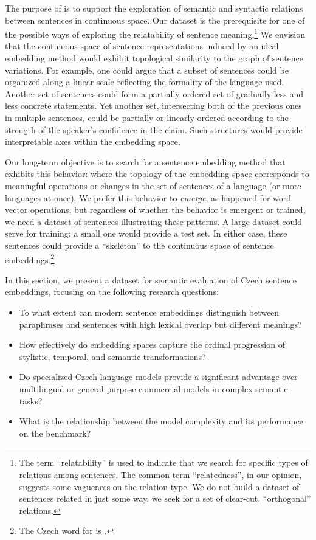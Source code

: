 The purpose of \costra is to support the exploration of semantic and syntactic relations between sentences in continuous space. Our dataset is the prerequisite for one of the possible ways of exploring the relatability of sentence meaning.\footnote{The term ``relatability'' is used to indicate that we search for specific types of relations among sentences. The common term ``relatedness'', in our opinion, suggests some vagueness on the relation type. We do not build a dataset of sentences related in just some way, we seek for a set of clear-cut, ``orthogonal'' relations.} We envision that the continuous space of sentence representations induced by an ideal embedding method would exhibit topological similarity to the graph of sentence variations. For example, one could argue that a subset of sentences could be organized along a linear scale reflecting the formality of the language used. Another set of sentences could form a partially ordered set of gradually less and less concrete statements. Yet another set, intersecting both of the previous ones in multiple sentences, could be partially or linearly ordered according to the strength of the speaker's confidence in the claim. Such structures would provide interpretable axes within the embedding space.

Our long-term objective is to search for a sentence embedding method that exhibits this behavior: where the topology of the embedding space corresponds to meaningful operations or changes in the set of sentences of a language (or more languages at once). We prefer this behavior to \emph{emerge}, as happened for word vector operations, but regardless of whether the behavior is emergent or trained, we need a dataset of sentences illustrating these patterns. A large dataset could serve for training; a small one would provide a test set. In either case, these sentences could provide a ``skeleton'' to the continuous space of sentence embeddings.\footnote{The Czech word for  is .}

\begin{mdframed}[
    linecolor=gray,
    linewidth=2pt,
    roundcorner=5,
    backgroundcolor=gray!5
]
\noindent
In this section, we present a dataset for semantic evaluation of Czech sentence embeddings, focusing on the following research questions:

\begin{itemize}
    \item To what extent can modern sentence embeddings distinguish between paraphrases and sentences with high lexical overlap but different meanings?
    \item How effectively do embedding spaces capture the ordinal progression of stylistic, temporal, and semantic transformations?
    \item Do specialized Czech-language models provide a significant advantage over multilingual or general-purpose commercial models in complex semantic tasks?
    \item What is the relationship between the model complexity and its performance on the \costra benchmark?
\end{itemize}
\end{mdframed}

